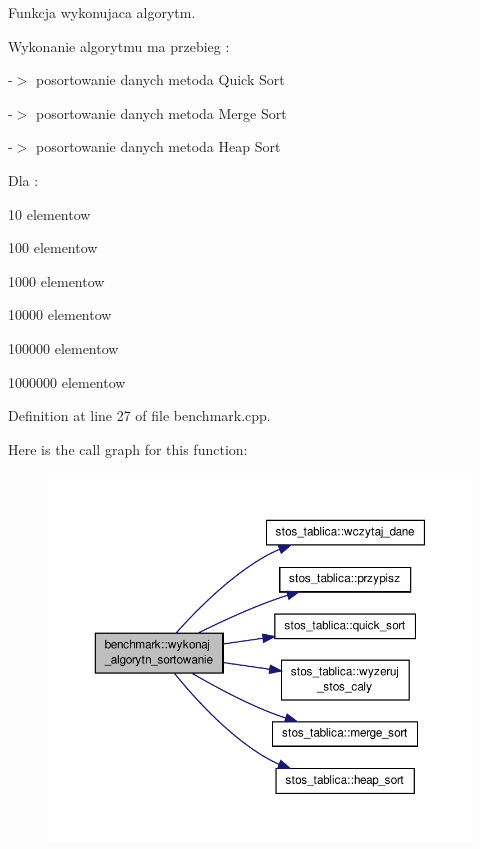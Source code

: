 Funkcja wykonujaca algorytm. 

Wykonanie algorytmu ma przebieg \-:\par
 -\/$>$ posortowanie danych metoda Quick Sort\par
 -\/$>$ posortowanie danych metoda Merge Sort\par
 -\/$>$ posortowanie danych metoda Heap Sort\par
 \par
 Dla \-:\par

\begin{DoxyItemize}
\item 10 elementow \par

\item 100 elementow \par

\item 1000 elementow \par

\item 10000 elementow \par

\item 100000 elementow \par

\item 1000000 elementow \par
 
\end{DoxyItemize}

Definition at line 27 of file benchmark.\-cpp.



Here is the call graph for this function\-:\nopagebreak
\begin{figure}[H]
\begin{center}
\leavevmode
\includegraphics[width=350pt]{classbenchmark_a845da6947383df74d871e273bf225721_cgraph}
\end{center}
\end{figure}


